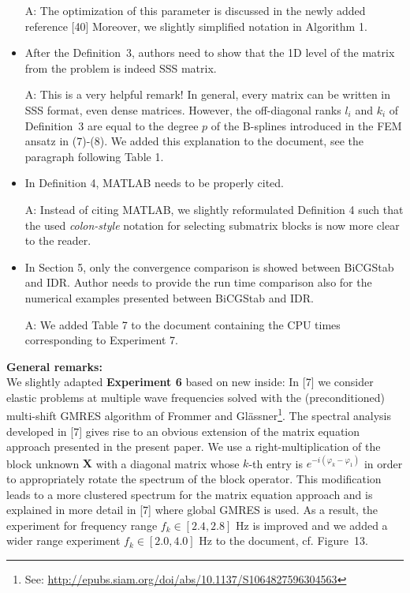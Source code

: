 \documentclass{article}
\begin{document}
\begin{itemize}
{\color{red}A: The optimization of this parameter is discussed in the newly added reference [40] Moreover, we slightly simplified notation in Algorithm 1.}

\item After the Definition~3, authors need to show that the 1D level of the matrix from the problem is indeed SSS matrix.

{\color{red}A: This is a very helpful remark! In general, every matrix can be written in SSS format, even dense matrices. However, the off-diagonal ranks $l_i$ and $k_i$ of Definition~3 are equal to the degree $p$ of the B-splines introduced in the FEM ansatz in (7)-(8). We added this explanation to the document, see the paragraph following Table 1.}

\item In Definition 4, MATLAB needs to be properly cited.

{\color{red}A: Instead of citing MATLAB, we slightly reformulated Definition 4 such that the used \textit{colon-style} notation for selecting submatrix blocks is now more clear to the reader.}

\newpage

\item In Section 5, only the convergence comparison is showed between BiCGStab and IDR. Author needs to provide the run time comparison also for the numerical examples presented between BiCGStab and IDR.

{\color{red}A: We added Table 7 to the document containing the CPU times corresponding to Experiment 7.}
\end{itemize}

\vspace{1cm}

\noindent \textbf{General remarks:}\\
We slightly adapted \textbf{Experiment 6} based on new inside: In [7] we consider elastic problems at multiple wave frequencies solved with the (preconditioned) multi-shift GMRES algorithm of Frommer and Gl\"assner\footnote{See: \href{http://epubs.siam.org/doi/abs/10.1137/S1064827596304563}{http://epubs.siam.org/doi/abs/10.1137/S1064827596304563}}. The spectral analysis developed in [7] gives rise to an obvious extension of the matrix equation approach presented in the present paper. We use a right-multiplication of the block unknown $\mathbf{X}$ with a diagonal matrix whose $k$-th entry is $e^{-i(\varphi_k-\varphi_1)}$ in order to appropriately rotate the spectrum of the block operator. This modification leads to a more clustered spectrum for the matrix equation approach and is explained in more detail in [7] where global GMRES is used. As a result, the experiment for frequency range $f_k \in [2.4,2.8]$ Hz is improved and we added a wider range experiment $f_k \in [2.0,4.0]$ Hz to the document, cf. Figure~13.
\end{document}
